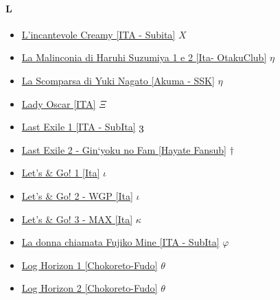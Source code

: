 		\paragraph{L} \hypertarget{SL}{}
			\begin{itemize}
				
				\item \href{https://mega.nz/#F!J7B3wBZD!dkEleQ_Iugl9tBlslM7syQ} {L'incantevole Creamy [ITA - Subita]}  $X$ \\ 
				\item \href{https://mega.nz/#F!9VcVUDAa!_ptP86pxd32Z8p_tbCxrGg} {La Malinconia di Haruhi Suzumiya 1 e 2 [Ita- OtakuClub]}  $\eta$ \\ 
				\item \href{https://mega.nz/#F!4Y1AVTTC!TJ01lyCgKGcjXLY3uxGCPQ} {La Scomparsa di Yuki Nagato [Akuma - SSK]}  $\eta$ \\ 
				\item \href{https://mega.nz/#F!0aY3QazZ!Y-hYfHNjIuEZXSFIEE8g5w} {Lady Oscar [ITA]}  $\varXi$ \\ 
				\item \href{https://mega.nz/#F!SHwhAIxA!I5unjK7gOSIBNikw5NbWLg} {Last Exile 1 [ITA - SubIta]}  $\oldstylenums{3}$ \\ 
				\item \href{https://mega.nz/#F!XbJBRQiY!hNkSSFhdpr3WjXpJ7bAXyw} {Last Exile 2 - Gin`yoku no Fam [Hayate Fansub]}  $\dag$ \\ 
				\item \href{https://mega.nz/#F!BxZ3WCRB!dcbwEufs6OC_vN4Png7UAg} {Let's \& Go! 1 [Ita]}  $\iota$ \\ 
				\item \href{https://mega.nz/#F!k4wz0IJY!6Ac6UI2liorIbdq0aicUKg} {Let's \& Go! 2 - WGP [Ita]}  $\iota$ \\ 
				\item \href{https://mega.nz/#F!yQBSWQIA!AFmr_M_RrIe0h87qrIS9-A} {Let's \& Go! 3 - MAX [Ita]}  $\kappa$ \\ 
				\item \href{https://mega.nz/#F!8KxggYIS!9CJCukIsABShp6GBvi3RCA} {La donna chiamata Fujiko Mine [ITA - SubIta]}  $\varphi$ \\ 
				\item \href{https://mega.nz/#F!111RWa4Y!Y1i-rdZlNTY-Ks_NKJmcMg} {Log Horizon 1 [Chokoreto-Fudo]}  $\theta$ \\ 
				\item \href{https://mega.nz/#F!QsFXwaib!lFIMeCRXDfWFBVDqPjLeNA} {Log Horizon 2 [Chokoreto-Fudo]}  $\theta$ \\ 

\end{itemize}
